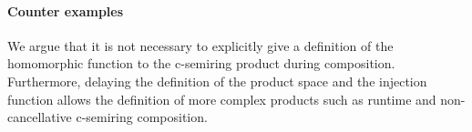 \paragraph{Counter examples}
We argue that it is not necessary to explicitly give a definition of the homomorphic function to the c-semiring product during composition. Furthermore, delaying the definition of the product space and the injection function allows the definition of more complex products such as runtime and non-cancellative c-semiring composition.